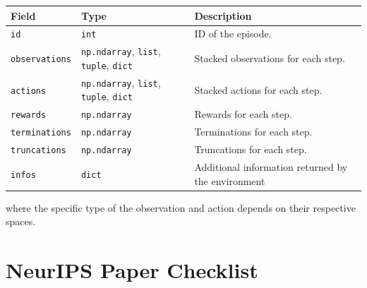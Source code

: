 \documentclass{article}
\newcommand\pythonstyle{\lstset{
language=Python,
basicstyle=\ttm,
morekeywords={self},              %
keywordstyle=\ttb\color{deepblue},
emph={MyClass,__init__},          %
emphstyle=\ttb\color{deepred},    %
stringstyle=\color{deepgreen},
frame=tb,                         %
showstringspaces=false
}}
\newcommand\pythoninline[1]{{\pythonstyle\lstinline!#1!}}
\begin{document}
\begin{table}[H]
    \centering
    \begin{tabular}{lll}
    \toprule
        Field & Type & Description \\ \midrule
        \pythoninline{id} & \pythoninline{int} & ID of the episode. \\
        \pythoninline{observations} & \pythoninline{np.ndarray}, \pythoninline{list}, \pythoninline{tuple}, \pythoninline{dict} & Stacked observations for each step. \\
        \pythoninline{actions} & \pythoninline{np.ndarray}, \pythoninline{list}, \pythoninline{tuple}, \pythoninline{dict} & Stacked actions for each step. \\
        \pythoninline{rewards} & \pythoninline{np.ndarray} & Rewards for each step. \\
        \pythoninline{terminations} & \pythoninline{np.ndarray} & Terminations for each step. \\
        \pythoninline{truncations} & \pythoninline{np.ndarray} & Truncations for each step. \\
        \pythoninline{infos} & \pythoninline{dict} & Additional information returned by the environment \\ \bottomrule
    \end{tabular}
\end{table}

where the specific type of the observation and action depends on their respective spaces.


\section*{NeurIPS Paper Checklist}
\end{document}
